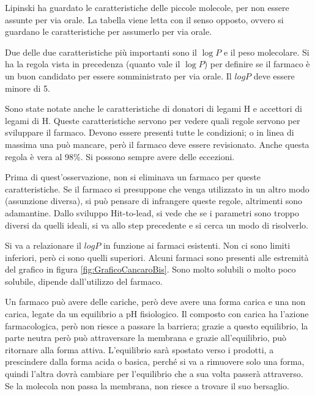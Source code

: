 Lipinski ha guardato le caratteristiche delle piccole molecole, per non
essere assunte per via orale. La tabella viene letta con il senso
opposto, ovvero si guardano le caratteristiche per assumerlo per via
orale.

Due delle due caratteristiche più importanti sono il \(\log P\) e il
peso molecolare. Si ha la regola vista in precedenza (quanto vale il
\(\log P\)) per definire se il farmaco è un buon candidato per essere
somministrato per via orale.
Il \(log P\) deve essere minore di 5.

Sono state notate anche le caratteristiche di donatori di legami H e
accettori di legami di H. Queste caratteristiche servono per vedere
quali regole servono per sviluppare il farmaco. Devono essere presenti
tutte le condizioni; o in linea di massima una può mancare, però il
farmaco deve essere revisionato.
Anche questa regola è vera al 98\%. Si possono sempre avere delle
eccezioni.

Prima di quest'osservazione, non si eliminava un farmaco per queste
caratteristiche. Se il farmaco si presuppone che venga utilizzato in un
altro modo (assunzione diversa), si può pensare di infrangere queste
regole, altrimenti sono adamantine.
Dallo sviluppo Hit-to-lead, si vede che se i parametri sono troppo
diversi da quelli ideali, si va allo step precedente e si cerca un modo
di risolverlo.

Si va a relazionare il \(log P\) in funzione ai farmaci esistenti. Non
ci sono limiti inferiori, però ci sono quelli superiori.
Alcuni farmaci sono presenti alle estremità del grafico in figura \ref{fig:GraficoCancaroBis}. Sono molto
solubili o molto poco solubile, dipende dall'utilizzo del farmaco.



Un farmaco può avere delle cariche, però deve avere una forma carica e
una non carica, legate da un equilibrio a pH fisiologico. Il composto
con carica ha l'azione farmacologica, però non riesce a passare la
barriera; grazie a questo equilibrio, la parte neutra però può
attraversare la membrana e grazie all'equilibrio, può ritornare alla
forma attiva.
L'equilibrio sarà spostato verso i prodotti, a prescindere dalla forma acida
o basica, perché si va a rimuovere solo una forma, quindi l'altra dovrà
cambiare per l'equilibrio che a sua volta passerà attraverso.
Se la molecola non passa la membrana, non riesce a trovare il suo
bersaglio.

